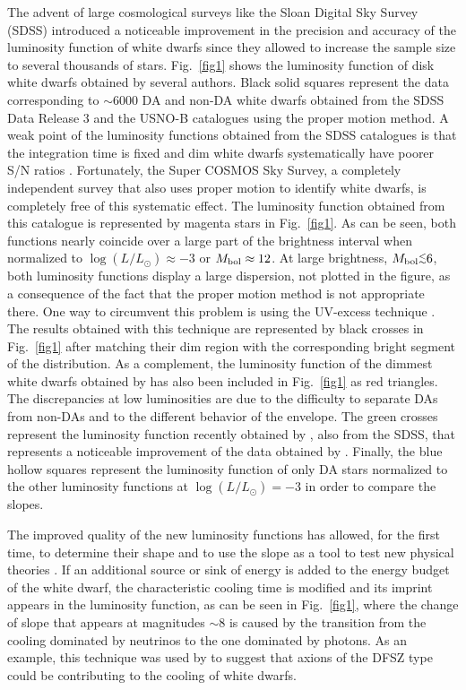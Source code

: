 \documentclass[useAMS,usenatbib]{mnras}
\newcommand{\lppr}{\stackrel{<}{\scriptstyle \sim}}
\newcommand{\lappr}{\raisebox{-0.4ex}{$\lppr$}}
\begin{document}
The advent of large cosmological surveys like the Sloan Digital Sky Survey (SDSS) 
introduced a noticeable improvement in the precision and accuracy of the luminosity function of 
white dwarfs since they allowed to increase the sample size to several thousands of stars. Fig.~\ref{fig1} shows the luminosity function of disk white dwarfs obtained by several authors. 
Black solid squares represent the data corresponding to $\sim 6000$ DA and non-DA white dwarfs obtained from the SDSS Data Release 3 and the USNO-B catalogues \citep{harr06} using the proper motion method. A weak point of the luminosity functions obtained from the SDSS catalogues is that the integration time is fixed and dim white dwarfs systematically have poorer S/N ratios \citep{limo10}. Fortunately, the Super COSMOS Sky Survey, a completely independent survey that also uses proper motion to identify white dwarfs, is completely free of this systematic effect. The luminosity function obtained from this catalogue is represented by magenta stars \citep{rowe11} in Fig.~\ref{fig1}. As can be seen, both functions nearly 
coincide over a large part of the brightness interval 
when normalized to $\log (L/L_\odot) \approx  -3$ or $M_{\rm bol} \approx 12$. At large brightness, $M_{\rm bol} \lappr 6$, both 
luminosity functions display a large dispersion, not plotted in the figure, as a consequence of 
the fact that the proper motion method is not appropriate there. One way to circumvent 
this problem is using the UV-excess technique \citep{krze09}. The results obtained with this 
technique are represented by black crosses in Fig.~\ref{fig1}  after matching their dim region 
with the corresponding bright segment  of the \citet{harr06} distribution. As 
a complement, the luminosity function of the dimmest white dwarfs obtained by \citet{legg98} 
has also been included in Fig.~\ref{fig1} as red triangles.  The discrepancies at low luminosities are due to the difficulty to separate DAs from non-DAs and to the different behavior of the envelope. 
The green crosses represent the luminosity function recently obtained by \citet{munn17}, also from the SDSS, that represents a noticeable improvement of the data obtained by \citet{harr06}. Finally, the blue hollow squares represent the luminosity function of only DA stars \citep{dege08} normalized to the other luminosity functions at $\log (L/L_\odot) = -3$ in order to compare the slopes.

The improved quality of the new luminosity functions has allowed, for the first time, to 
determine their shape and to use the slope as a tool to test new physical theories  \citep{raff96,iser08}.  If  an additional  source or  sink  of energy  is  added to the energy budget of the white dwarf, the  characteristic cooling time  is modified  and its imprint  appears in  the luminosity function, as can  be seen  in Fig.~\ref{fig1},  where the  change of slope that appears at magnitudes $\sim 8$ is caused by the transition from the cooling dominated by neutrinos to the one dominated by photons. As an example, this technique was used by \citet{iser08a} to suggest that axions of the DFSZ type could be contributing to the cooling of white dwarfs.
\end{document}
